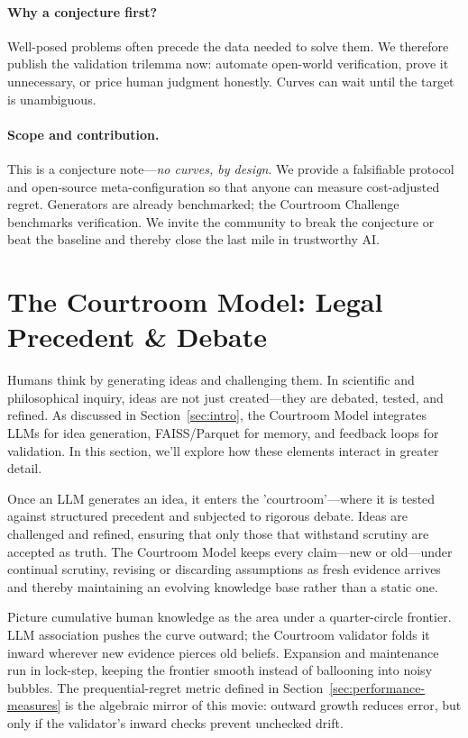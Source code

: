 \documentclass[11pt]{article}
\begin{document}
\paragraph{Why a conjecture first?}
Well-posed problems often precede the data needed to solve them.  We
therefore publish the validation trilemma now: automate open-world
verification, prove it unnecessary, or price human judgment honestly.
Curves can wait until the target is unambiguous.

\paragraph{Scope and contribution.}
This is a conjecture note—\emph{no curves, by design}.  We provide a
falsifiable protocol and open-source meta-configuration so that anyone can
measure cost-adjusted regret.  Generators are already benchmarked; the
Courtroom Challenge benchmarks verification.  We invite the community
to break the conjecture or beat the baseline and thereby close the last
mile in trustworthy AI.

\section{The Courtroom Model: Legal Precedent \& Debate}
\label{sec:courtroom}
Humans think by generating ideas and challenging them. In scientific and philosophical inquiry, ideas are not just created—they are debated, tested, and refined. As discussed in Section~\ref{sec:intro}, the Courtroom Model integrates LLMs for idea generation, FAISS/Parquet for memory, and feedback loops for validation. In this section, we'll explore how these elements interact in greater detail.

Once an LLM generates an idea, it enters the 'courtroom'—where it is tested against structured precedent and subjected to rigorous debate. Ideas are challenged and refined, ensuring that only those that withstand scrutiny are accepted as truth. The Courtroom Model keeps every claim—new or old—under continual scrutiny, revising or discarding assumptions as fresh evidence arrives and thereby maintaining an evolving knowledge base rather than a static one.

Picture cumulative human knowledge as the area under a quarter-circle frontier. LLM association pushes the curve outward; the Courtroom validator folds it inward wherever new evidence pierces old beliefs. Expansion and maintenance run in lock-step, keeping the frontier smooth instead of ballooning into noisy bubbles. The prequential-regret metric defined in Section~\ref{sec:performance-measures} is the algebraic mirror of this movie: outward growth reduces error, but only if the validator's inward checks prevent unchecked drift.
\end{document}
